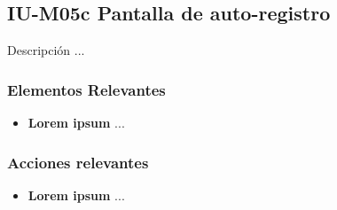 
\subsection{IU-M05c Pantalla de auto-registro}

 Descripción ...


\subsubsection{Elementos Relevantes}

    \begin{itemize}
    \item {\bf Lorem ipsum}
        ...
    \end{itemize}

\subsubsection{Acciones relevantes}

    \begin{itemize}
    \item {\bf Lorem ipsum}
        ...
    \end{itemize}

\clearpage

